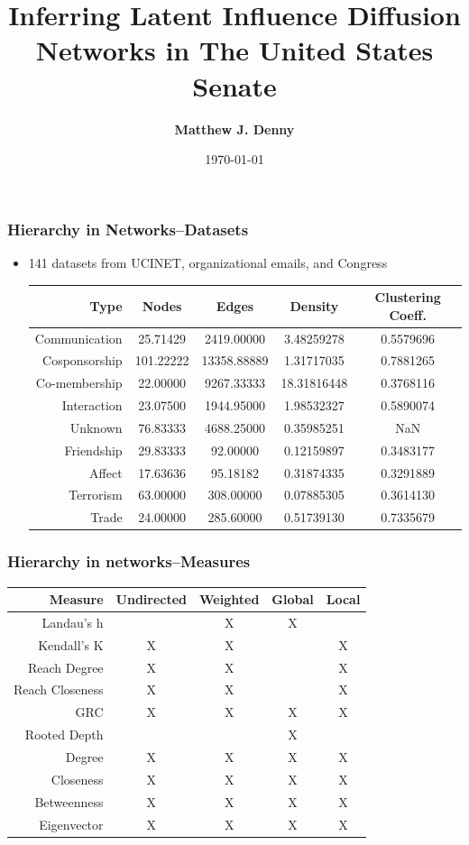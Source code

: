 \documentclass[xcolor={table}]{beamer}
\title{Inferring Latent Influence Diffusion Networks in The United States Senate}
\author{\Large\textbf{Matthew J. Denny}}
\institute{\Large Penn State University ---
 \texttt{mzd5530@psu.edu}\\
 \color{blue}\texttt{www.mjdenny.com}\\
 \texttt{@MatthewJDenny}
}
\date{ \today }
\begin{document}






\begin{frame}\frametitle{Hierarchy in Networks--Datasets}
\begin{itemize}
	\item 141 datasets from UCINET, organizational emails, and Congress
	\vspace{.2in}
	\scriptsize
	\begin{table}
		\begin{tabular}{| r || c | c | c | c |}
			\hline
			Type & Nodes & Edges & Density & Clustering Coeff. \\
			\hline
			Communication & 25.71429  &2419.00000  &3.48259278 &             0.5579696 \\
			Cosponsorship &101.22222 &13358.88889  &1.31717035  &            0.7881265\\
			Co-membership & 22.00000  &9267.33333 &18.31816448  &            0.3768116\\
			Interaction & 23.07500 & 1944.95000 & 1.98532327   &           0.5890074\\
			Unknown & 76.83333 & 4688.25000 & 0.35985251   &              
			   NaN\\
			Friendship & 29.83333  &  92.00000 & 0.12159897    &          0.3483177\\
			Affect & 17.63636  &  95.18182 & 0.31874335      &
			        0.3291889\\
			Terrorism & 63.00000 &  308.00000 & 0.07885305    &          0.3614130\\
			Trade & 24.00000 &  285.60000 & 0.51739130     &
			         0.7335679\\
			\hline
		\end{tabular}
	\end{table}
\end{itemize}
\end{frame}

\begin{frame}\frametitle{Hierarchy in networks--Measures}
\begin{table}
	\begin{tabular}{| r || c | c | c | c |}
		\hline
		Measure & Undirected & Weighted & Global & Local \\
		\hline
		Landau's h & & X& X& \\
		Kendall's K & X& X& &X\\
		Reach Degree & X& X& &X\\
		Reach Closeness & X& X& &X\\
		GRC & X& X& X&X\\
		Rooted Depth & & & X&\\
		Degree & X& X& X&X\\
		Closeness & X& X& X&X\\
		Betweenness & X& X& X&X\\
		Eigenvector &  X& X& X& X \\
		\hline
	\end{tabular}
\end{table}
\end{frame}
\end{document}
